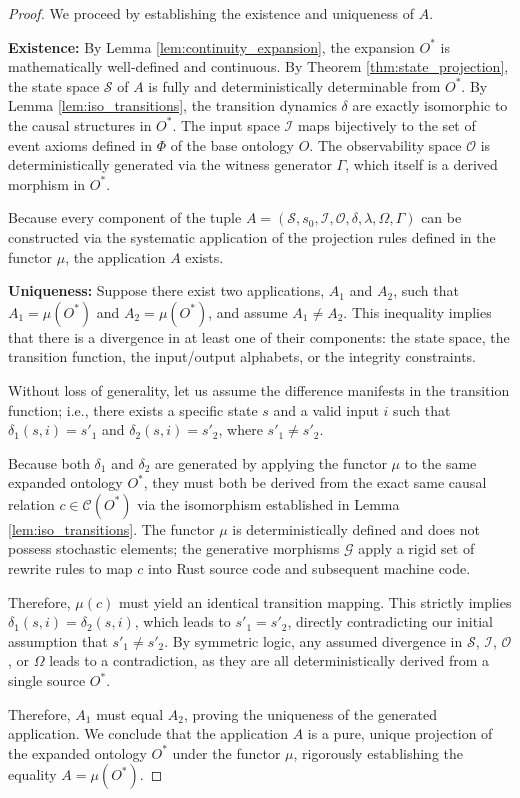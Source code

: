 \begin{proof}
We proceed by establishing the existence and uniqueness of $A$.

\textbf{Existence:} By Lemma \ref{lem:continuity_expansion}, the expansion $O^*$ is mathematically well-defined and continuous. By Theorem \ref{thm:state_projection}, the state space $\mathcal{S}$ of $A$ is fully and deterministically determinable from $O^*$. By Lemma \ref{lem:iso_transitions}, the transition dynamics $\delta$ are exactly isomorphic to the causal structures in $O^*$. The input space $\mathcal{I}$ maps bijectively to the set of event axioms defined in $\Phi$ of the base ontology $O$. The observability space $\mathcal{O}$ is deterministically generated via the witness generator $\Gamma$, which itself is a derived morphism in $O^*$.

Because every component of the tuple $A = (\mathcal{S}, s_0, \mathcal{I}, \mathcal{O}, \delta, \lambda, \Omega, \Gamma)$ can be constructed via the systematic application of the projection rules defined in the functor $\mu$, the application $A$ exists.

\textbf{Uniqueness:} Suppose there exist two applications, $A_1$ and $A_2$, such that $A_1 = \mu(O^*)$ and $A_2 = \mu(O^*)$, and assume $A_1 \neq A_2$. This inequality implies that there is a divergence in at least one of their components: the state space, the transition function, the input/output alphabets, or the integrity constraints.

Without loss of generality, let us assume the difference manifests in the transition function; i.e., there exists a specific state $s$ and a valid input $i$ such that $\delta_1(s, i) = s'_1$ and $\delta_2(s, i) = s'_2$, where $s'_1 \neq s'_2$.

Because both $\delta_1$ and $\delta_2$ are generated by applying the functor $\mu$ to the same expanded ontology $O^*$, they must both be derived from the exact same causal relation $c \in \mathcal{C}(O^*)$ via the isomorphism established in Lemma \ref{lem:iso_transitions}. The functor $\mu$ is deterministically defined and does not possess stochastic elements; the generative morphisms $\mathcal{G}$ apply a rigid set of rewrite rules to map $c$ into Rust source code and subsequent machine code. 

Therefore, $\mu(c)$ must yield an identical transition mapping. This strictly implies $\delta_1(s, i) = \delta_2(s, i)$, which leads to $s'_1 = s'_2$, directly contradicting our initial assumption that $s'_1 \neq s'_2$. By symmetric logic, any assumed divergence in $\mathcal{S}$, $\mathcal{I}$, $\mathcal{O}$, or $\Omega$ leads to a contradiction, as they are all deterministically derived from a single source $O^*$.

Therefore, $A_1$ must equal $A_2$, proving the uniqueness of the generated application. We conclude that the application $A$ is a pure, unique projection of the expanded ontology $O^*$ under the functor $\mu$, rigorously establishing the equality $A = \mu(O^*)$.
\end{proof}

